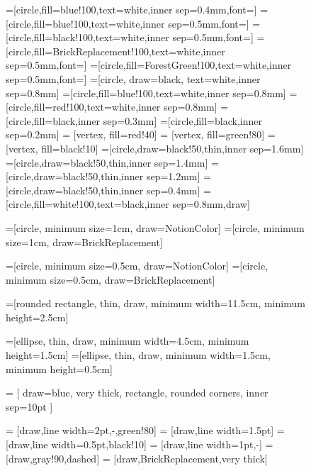 \documentclass{theoretics}
\begin{document}
\begin{figure}[ht]
	\begin{center}
		=[circle,fill=blue!100,text=white,inner sep=0.4mm,font=\scriptsize]
		=[circle,fill=blue!100,text=white,inner sep=0.5mm,font=\small]
		=[circle,fill=black!100,text=white,inner sep=0.5mm,font=\small]
		=[circle,fill=BrickReplacement!100,text=white,inner sep=0.5mm,font=\small]
		=[circle,fill=ForestGreen!100,text=white,inner sep=0.5mm,font=\small]
		=[circle, draw=black, text=white,inner sep=0.8mm]
		=[circle,fill=blue!100,text=white,inner sep=0.8mm]
		=[circle,fill=red!100,text=white,inner sep=0.8mm]
		=[circle,fill=black,inner sep=0.3mm]
		=[circle,fill=black,inner sep=0.2mm]
		 = [vertex, fill=red!40]
		 = [vertex, fill=green!80]
		 = [vertex, fill=black!10]
		=[circle,draw=black!50,thin,inner sep=1.6mm]
		=[circle,draw=black!50,thin,inner sep=1.4mm]
		=[circle,draw=black!50,thin,inner sep=1.2mm]
		=[circle,draw=black!50,thin,inner sep=0.4mm]
		=[circle,fill=white!100,text=black,inner sep=0.8mm,draw]
		
		=[circle, minimum size=1cm, draw=NotionColor]
		=[circle, minimum size=1cm, draw=BrickReplacement]
		
		=[circle, minimum size=0.5cm, draw=NotionColor]
		=[circle, minimum size=0.5cm, draw=BrickReplacement]
		
		=[rounded rectangle, thin, draw, minimum width=11.5cm, minimum height=2.5cm]
		
		
		
		=[ellipse, thin, draw, minimum width=4.5cm, minimum height=1.5cm]
		=[ellipse, thin, draw, minimum width=1.5cm, minimum height=0.5cm]
		
		 = [
		draw=blue, very thick,
		rectangle, rounded corners,
		inner sep=10pt
		]
		
		 = [draw,line width=2pt,-,green!80]
		 = [draw,line width=1.5pt]
		 = [draw,line width=0.5pt,black!10]
		 = [draw,line width=1pt,-]
		 = [draw,gray!90,dashed]
		 = [draw,BrickReplacement,very thick]
		

\end{center}
\end{figure}
\end{document}
